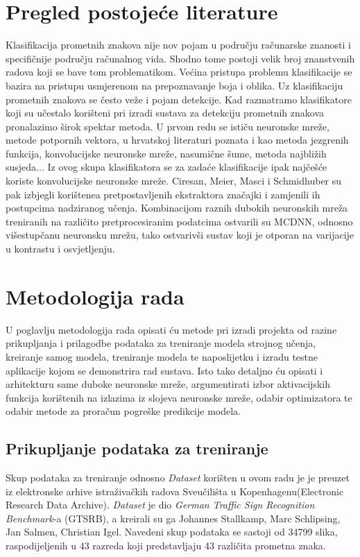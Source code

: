 \documentclass[times, utf8, zavrsni]{fer}
\begin{document}
\chapter{Pregled postojeće literature}
Klasifikacija prometnih znakova nije nov pojam u području računarske znanosti i specifičnije području računalnog vida. Shodno tome postoji velik broj znanstvenih radova koji se bave tom problematikom.
Većina pristupa problemu klasifikacije se bazira na pristupu usmjerenom na prepoznavanje boja i oblika.\citep{6033494}
Uz klasifikaciju prometnih znakova se često veže i pojam detekcije.
Kad razmatramo klasifikatore koji su učestalo korišteni pri izradi sustava za detekciju prometnih znakova pronalazimo širok spektar metoda. 
U prvom redu se ističu neuronske mreže, metode potpornih vektora, u hrvatskoj literaturi poznata i kao metoda jezgrenih funkcija, konvolucijske neuronske mreže, nasumične šume, metoda najbližih susjeda...
Iz ovog skupa klasifikatora se za zadaće klasifikacije ipak najčešće koriste konvolucijske neuronske mreže.\citep{9065537}
Ciresan, Meier, Masci i Schmidhuber su pak izbjegli korištenea pretpostavljenih ekstraktora značajki i zamjenili ih postupcima nadziranog učenja. Kombinacijom raznih dubokih
neuronskih mreža treniranih na različito pretprocesiranim podatcima ostvarili su MCDNN, odnosno višestupčanu neuronsku mrežu, tako ostvarivši sustav koji je otporan na varijacije u kontrastu i osvjetljenju. \citep{CIRESAN2012333}
\chapter{Metodologija rada}
U poglavlju metodologija rada opisati ću metode pri izradi projekta od razine prikupljanja i prilagodbe podataka za treniranje modela strojnog učenja, kreiranje samog modela, treniranje modela te naposlijetku i izradu testne aplikacije kojom se demonstrira rad sustava.
Isto tako detaljno ću opisati i arhitekturu same duboke neuronske mreže, argumentirati izbor aktivacijskih funkcija korištenih na izlazima iz slojeva neuronske mreže, odabir optimizatora te odabir metode za proračun pogreške predikcije modela.
\pagebreak
\section{Prikupljanje podataka za treniranje}
Skup podataka za treniranje odnosno
\emph{Dataset} korišten u ovom radu je je preuzet iz elektronske arhive istraživačkih radova Sveučilišta u Kopenhagenu(Electronic Research Data Archive).
\emph{Dataset} je dio \emph{German Traffic Sign Recognition Benchmark}-a (GTSRB), a kreirali su ga Johannes Stallkamp, Marc Schlipsing, Jan Salmen, Christian Igel.
Navedeni skup podataka se sastoji od 34799 slika, raspodijeljenih u 43 razreda koji predstavljaju 43 različita prometna znaka.
\end{document}
